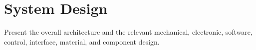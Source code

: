 \section{System Design}
Present the overall architecture and the relevant mechanical, 
electronic, software, control, interface, material, and component design. 